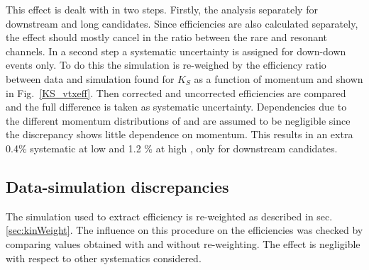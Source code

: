 This effect is dealt with in two steps. Firstly, the analysis separately for downstream and long candidates.
Since efficiencies are also calculated separately, the effect should mostly cancel in the ratio between the
rare and resonant channels. In a second step a systematic uncertainty is assigned for down-down events only.
To do this the simulation is re-weighed by the efficiency ratio between data and simulation
found for $K_S$ as a function of momentum and shown in Fig.~\ref{KS_vtxeff}. Then corrected and uncorrected
efficiencies are compared and the full difference is taken as systematic uncertainty. Dependencies due to
the different momentum distributions of \Lz and \KS are assumed to be negligible since 
the discrepancy shows little dependence on momentum. This results in an extra 0.4\% systematic at low \qsq
and 1.2 \% at high \qsq, only for downstream candidates.

\subsection{Data-simulation discrepancies}

The simulation used to extract efficiency is re-weighted as described in sec.\ref{sec:kinWeight}.
The influence on this procedure on the efficiencies was checked by comparing values obtained with
and without re-weighting. The effect is negligible with respect to other systematics considered.










